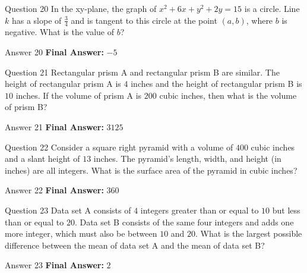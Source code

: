 \documentclass{beamer}
\begin{document}
\begin{frame}{Question 20}
\small
In the xy-plane, the graph of $x^{2}+6x+y^{2}+2y=15$ is a circle. 
Line $k$ has a slope of $\tfrac{3}{4}$ and is tangent to this circle at the point $(a,b)$, where $b$ is negative. 
What is the value of $b$?
\end{frame}
\begin{frame}{Answer 20}
\small
\textbf{Final Answer:} $\boxed{-5}$
\end{frame}

\begin{frame}{Question 21}
\small
Rectangular prism A and rectangular prism B are similar. 
The height of rectangular prism A is $4$ inches and the height of rectangular prism B is $10$ inches. 
If the volume of prism A is $200$ cubic inches, then what is the volume of prism B?
\end{frame}
\begin{frame}{Answer 21}
\small
\textbf{Final Answer:} $\boxed{3125}$
\end{frame}

\begin{frame}{Question 22}
\small
Consider a square right pyramid with a volume of $400$ cubic inches and a slant height of $13$ inches. 
The pyramid's length, width, and height (in inches) are all integers. 
What is the surface area of the pyramid in cubic inches?
\end{frame}
\begin{frame}{Answer 22}
\small
\textbf{Final Answer:} $\boxed{360}$
\end{frame}

\begin{frame}{Question 23}
\small
Data set A consists of $4$ integers greater than or equal to $10$ but less than or equal to $20$. 
Data set B consists of the same four integers and adds one more integer, which must also be between $10$ and $20$. 
What is the largest possible difference between the mean of data set A and the mean of data set B?
\end{frame}
\begin{frame}{Answer 23}
\small
\textbf{Final Answer:} $\boxed{2}$
\end{frame}
\end{document}
